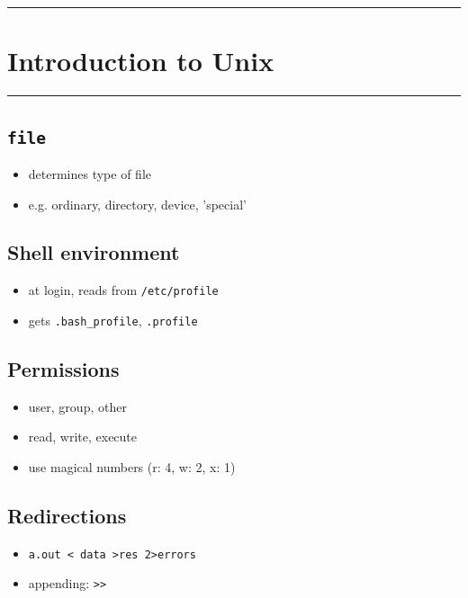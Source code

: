 \documentclass[10pt, multicolumn, a4paper]{article}
\begin{document}
\setcounter{section}{1} %
\hrule
\section{Introduction to Unix}
\hrule 

\begin{multicols}{2}
	\subsection*{\texttt{file}}
	\begin{itemize}
	\item determines type of file
	\item e.g. ordinary, directory, device, 'special'
	\end{itemize}
	\subsection*{Shell environment}
	\begin{itemize}
	\item at login, reads from \verb|/etc/profile|
	\item gets \verb|.bash_profile|, \verb|.profile|
	\end{itemize}
	\subsection*{Permissions}
	\begin{itemize}
	\item user, group, other
	\item read, write, execute
	\item use magical numbers (r: 4, w: 2, x: 1)
	\end{itemize}
	\subsection*{Redirections}
	\begin{itemize}
	\item \verb|a.out < data >res 2>errors|
	\item appending: \verb|>>|
	\end{itemize}

\end{multicols}
\end{document}
